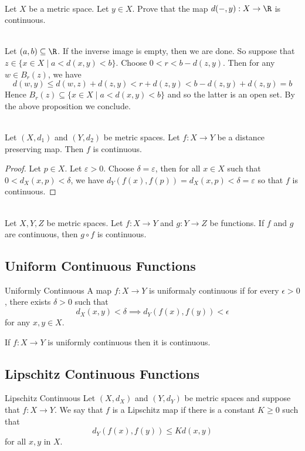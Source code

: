 \documentclass[a4paper]{article}
\begin{document}
\begin{eg}{}{}\\
Let $X$ be a metric space. Let $y\in X$. Prove that the map $d(-,y):X\to\R$ is continuous. 
\begin{answer}\\
Let $(a,b)\subseteq\R$. If the inverse image is empty, then we are done. So suppose that $z\in\{x\in X\;|\;a<d(x,y)<b\}$. Choose $0<r<b-d(z,y)$. Then for any $w\in B_r(z)$, we have $$d(w,y)\leq d(w,z)+d(z,y)<r+d(z,y)<b-d(z,y)+d(z,y)=b$$ Hence $B_r(z)\subseteq\{x\in X\;|\;a<d(x,y)<b\}$ and so the latter is an open set. By the above proposition we conclude. 
\end{answer}
\end{eg}

\begin{lmm}{}{}\\
Let $(X,d_1)$ and $(Y,d_2)$ be metric spaces. Let $f:X\to Y$ be a distance preserving map. Then $f$ is continuous. 
\begin{proof}
Let $p\in X$. Let $\varepsilon>0$. Choose $\delta=\varepsilon$, then for all $x\in X$ such that $0<d_X(x,p)<\delta$, we have $d_Y(f(x),f(p))=d_X(x,p)<\delta=\varepsilon$ so that $f$ is continuous. 
\end{proof}
\end{lmm}

\begin{prp}{}{}\\
Let $X,Y,Z$ be metric spaces. Let $f:X\to Y$ and $g:Y\to Z$ be functions. If $f$ and $g$ are continuous, then $g\circ f$ is continuous. 
\end{prp}

\subsection{Uniform Continuous Functions}
\begin{defn}{Uniformly Continuous}{} A map $f:X\to Y$ is uniformaly continuous if for every $\epsilon>0$, there exists $\delta>0$ such that $$d_X(x,y)<\delta\implies d_Y(f(x),f(y))<\epsilon$$ for any $x,y\in X$. 
\end{defn}

\begin{lmm}{}{} If $f:X\to Y$ is uniformly continuous then it is continuous. 
\end{lmm}

\subsection{Lipschitz Continuous Functions}
\begin{defn}{Lipschitz Continuous}{} Let $(X,d_X)$ and $(Y,d_Y)$ be metric spaces and suppose that $f:X\to Y$. We say that $f$ is a Lipschitz map if there is a constant $K\geq 0$ such that $$d_Y(f(x),f(y))\leq Kd(x,y)$$ for all $x,y$ in $X$. 
\end{defn}
\end{document}
